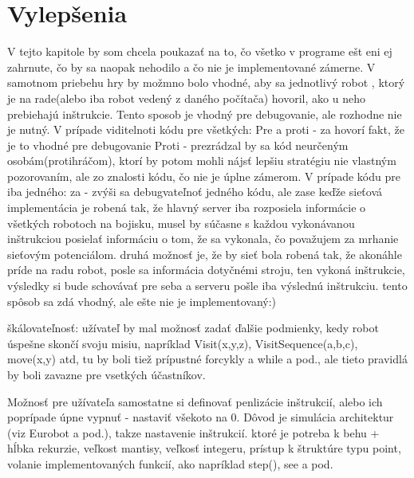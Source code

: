 \chapter{Vylepšenia}
V tejto kapitole by som chcela poukazať na to, čo všetko v programe ešt eni ej zahrnute, čo by sa naopak nehodilo a čo nie je implementované zámerne.
V samotnom priebehu hry by možmno bolo vhodné, aby sa jednotlivý robot , ktorý je na rade(alebo iba robot vedený z daného počítača) hovoril, ako u neho prebiehajú inštrukcie. Tento sposob je vhodný pre debugovanie, ale rozhodne nie je nutný.
V prípade viditelnoti kódu pre všetkých:
Pre a proti - za hovorí fakt, že je to vhodné pre debugovanie
Proti - prezrádzal by sa kód neurčeným osobám(protihráčom), ktorí by potom mohli nájsť lepšiu stratégiu nie vlastným pozorovaním, ale zo znalosti kódu, čo nie je úplne zámerom.
V prípade kódu pre iba jedného:
za - zvýši sa debugvateľnoť jedného kódu, ale zase keďže sieťová implementácia je robená tak, že hlavný server iba rozposiela informácie o všetkých robotoch na bojisku, musel by súčasne s každou vykonávanou inštrukciou posielať informáciu o tom, že sa vykonala, čo považujem za mrhanie sieťovým potenciálom. druhá možnosť je, že by sieť bola robená tak, že akonáhle príde na radu robot, posle sa informácia dotyčnémi stroju, ten vykoná inštrukcie, výsledky si bude schovávať pre seba a serveru pošle iba výslednú inštrukciu. tento spôsob sa zdá vhodný, ale ešte nie je implementovaný:)

škálovateľnosť:
užívateľ by mal možnosť zadať ďalšie podmienky, kedy robot úspešne skončí svoju misiu, napríklad Visit(x,y,z), VisitSequence(a,b,c), move(x,y) atd, tu by boli tiež prípustné forcykly  a while a pod., ale tieto pravidlá by boli zavazne pre vsetkých účastníkov.

Možnosť pre užívateľa samostatne si definovať penlizácie inštrukcií, alebo ich poprípade úpne vypnuť - nastaviť všekoto na 0. Dôvod je simulácia architektur (viz Eurobot a pod.), takze nastavenie inštrukcií. ktoré je potreba k behu + hĺbka rekurzie, veľkost mantisy, veľkosť integeru, prístup k štruktúre typu point, volanie implementovaných funkcií, ako napríklad step(), see a pod.
